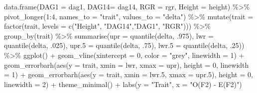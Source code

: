 \documentclass[
  letterpaper,
  DIV=11,
  numbers=noendperiod]{scrartcl}
\newenvironment{Shaded}{\begin{snugshade}}{\end{snugshade}}
\newcommand{\AttributeTok}[1]{\textcolor[rgb]{0.40,0.45,0.13}{#1}}
\newcommand{\DecValTok}[1]{\textcolor[rgb]{0.68,0.00,0.00}{#1}}
\newcommand{\FloatTok}[1]{\textcolor[rgb]{0.68,0.00,0.00}{#1}}
\newcommand{\FunctionTok}[1]{\textcolor[rgb]{0.28,0.35,0.67}{#1}}
\newcommand{\NormalTok}[1]{\textcolor[rgb]{0.00,0.23,0.31}{#1}}
\newcommand{\SpecialCharTok}[1]{\textcolor[rgb]{0.37,0.37,0.37}{#1}}
\newcommand{\StringTok}[1]{\textcolor[rgb]{0.13,0.47,0.30}{#1}}
\begin{document}
\begin{Shaded}
\begin{Highlighting}[]
\FunctionTok{data.frame}\NormalTok{(}\AttributeTok{DAG1 =}\NormalTok{ dag1, }\AttributeTok{DAG14=}\NormalTok{ dag14, }
           \AttributeTok{RGR =}\NormalTok{ rgr, }\AttributeTok{Height =}\NormalTok{ height) }\SpecialCharTok{\%\textgreater{}\%} 
  \FunctionTok{pivot\_longer}\NormalTok{(}\DecValTok{1}\SpecialCharTok{:}\DecValTok{4}\NormalTok{, }\AttributeTok{names\_to =} \StringTok{"trait"}\NormalTok{, }\AttributeTok{values\_to =} \StringTok{"delta"}\NormalTok{) }\SpecialCharTok{\%\textgreater{}\%} 
  \FunctionTok{mutate}\NormalTok{(}\AttributeTok{trait =} \FunctionTok{factor}\NormalTok{(trait, }\AttributeTok{levels =} \FunctionTok{c}\NormalTok{(}\StringTok{"Height"}\NormalTok{, }\StringTok{"DAG14"}\NormalTok{,}\StringTok{"DAG1"}\NormalTok{, }\StringTok{"RGR"}\NormalTok{))) }\SpecialCharTok{\%\textgreater{}\%} 
  \FunctionTok{group\_by}\NormalTok{(trait) }\SpecialCharTok{\%\textgreater{}\%} 
  \FunctionTok{summarise}\NormalTok{(}\AttributeTok{upr =} \FunctionTok{quantile}\NormalTok{(delta, .}\DecValTok{975}\NormalTok{),}
            \AttributeTok{lwr =} \FunctionTok{quantile}\NormalTok{(delta, .}\DecValTok{025}\NormalTok{),}
            \AttributeTok{upr.5 =} \FunctionTok{quantile}\NormalTok{(delta, .}\DecValTok{75}\NormalTok{),}
            \AttributeTok{lwr.5 =} \FunctionTok{quantile}\NormalTok{(delta, .}\DecValTok{25}\NormalTok{)) }\SpecialCharTok{\%\textgreater{}\%} 
  \FunctionTok{ggplot}\NormalTok{() }\SpecialCharTok{+}
  \FunctionTok{geom\_vline}\NormalTok{(}\AttributeTok{xintercept =} \DecValTok{0}\NormalTok{, }\AttributeTok{color =} \StringTok{"grey"}\NormalTok{, }\AttributeTok{linewidth =} \DecValTok{1}\NormalTok{) }\SpecialCharTok{+}
  \FunctionTok{geom\_errorbarh}\NormalTok{(}\FunctionTok{aes}\NormalTok{(}\AttributeTok{y =}\NormalTok{ trait, }\AttributeTok{xmin =}\NormalTok{ lwr, }\AttributeTok{xmax =}\NormalTok{ upr), }\AttributeTok{height =} \DecValTok{0}\NormalTok{, }
                 \AttributeTok{linewidth =} \DecValTok{1}\NormalTok{) }\SpecialCharTok{+}
  \FunctionTok{geom\_errorbarh}\NormalTok{(}\FunctionTok{aes}\NormalTok{(}\AttributeTok{y =}\NormalTok{ trait, }\AttributeTok{xmin =}\NormalTok{ lwr}\FloatTok{.5}\NormalTok{, }\AttributeTok{xmax =}\NormalTok{ upr}\FloatTok{.5}\NormalTok{), }\AttributeTok{height =} \DecValTok{0}\NormalTok{, }
                 \AttributeTok{linewidth =} \DecValTok{2}\NormalTok{) }\SpecialCharTok{+}
  \FunctionTok{theme\_minimal}\NormalTok{() }\SpecialCharTok{+}
  \FunctionTok{labs}\NormalTok{(}\AttributeTok{y =} \StringTok{"Trait"}\NormalTok{,}
       \AttributeTok{x =} \StringTok{"O(F2) {-} E(F2)"}\NormalTok{)}
\end{Highlighting}
\end{Shaded}
\end{document}
